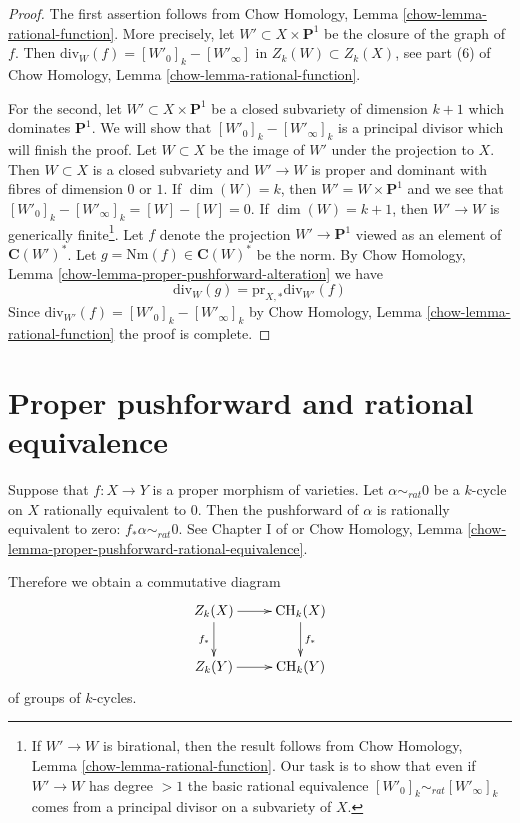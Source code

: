 \documentclass{stacks-project}
\theoremstyle{plain}
\theoremstyle{definition}
\theoremstyle{remark}
\numberwithin{equation}{subsection}
\def\CH{\mathop{\mathrm{CH}}\nolimits}
\begin{document}
\begin{proof}
The first assertion follows from
Chow Homology, Lemma \ref{chow-lemma-rational-function}.
More precisely, let $W' \subset X \times \mathbf{P}^1$ be the closure
of the graph of $f$. Then $\text{div}_W(f) = [W'_0]_k - [W'_\infty]$
in $Z_k(W) \subset Z_k(X)$, see part (6) of
Chow Homology, Lemma \ref{chow-lemma-rational-function}.

\medskip\noindent
For the second, let $W' \subset X \times \mathbf{P}^1$ be a closed
subvariety of dimension $k + 1$ which dominates $\mathbf{P}^1$.
We will show that $[W'_0]_k - [W'_\infty]_k$ is a principal divisor
which will finish the proof. Let $W \subset X$ be the image of $W'$
under the projection to $X$. Then $W \subset X$ is a closed subvariety
and $W' \to W$ is proper and dominant with fibres of dimension $0$
or $1$. If $\dim(W) = k$, then $W' = W \times \mathbf{P}^1$ and we
see that $[W'_0]_k - [W'_\infty]_k = [W] - [W] = 0$.
If $\dim(W) = k + 1$, then
$W' \to W$ is generically finite\footnote{If $W' \to W$ is birational,
then the result follows from
Chow Homology, Lemma \ref{chow-lemma-rational-function}.
Our task is to show that even if $W' \to W$
has degree $> 1$ the basic rational equivalence
$[W'_0]_k \sim_{rat} [W'_\infty]_k$ comes from a principal divisor
on a subvariety of $X$.}. Let $f$ denote the projection $W' \to \mathbf{P}^1$
viewed as an element of $\mathbf{C}(W')^*$. Let
$g = \text{Nm}(f) \in \mathbf{C}(W)^*$ be the norm. By
Chow Homology, Lemma \ref{chow-lemma-proper-pushforward-alteration}
we have
$$
\text{div}_W(g) = \text{pr}_{X, *}\text{div}_{W'}(f)
$$
Since $\text{div}_{W'}(f) = [W'_0]_k - [W'_\infty]_k$ 
by Chow Homology, Lemma \ref{chow-lemma-rational-function}
the proof is complete.
\end{proof}


\section{Proper pushforward and rational equivalence}
\label{section-pushforward-and-rational-equivalence}

\noindent
Suppose that $f : X \to Y$ is a proper morphism of varieties.
Let $\alpha \sim_{rat} 0$ be a $k$-cycle on
$X$ rationally equivalent to $0$. Then the {pushforward}
of $\alpha$ is rationally equivalent to zero:
$f_* \alpha \sim_{rat} 0$. See Chapter I of \cite{F} or
Chow Homology, Lemma \ref{chow-lemma-proper-pushforward-rational-equivalence}.

\medskip\noindent
Therefore we obtain a commutative diagram
$$
\xymatrix{
Z_k(X) \ar[r] \ar[d]_{f_*} & \CH_k(X) \ar[d]^{f_*} \\
Z_k(Y) \ar[r] & \CH_k(Y)
}
$$
of groups of $k$-cycles.
\end{document}
